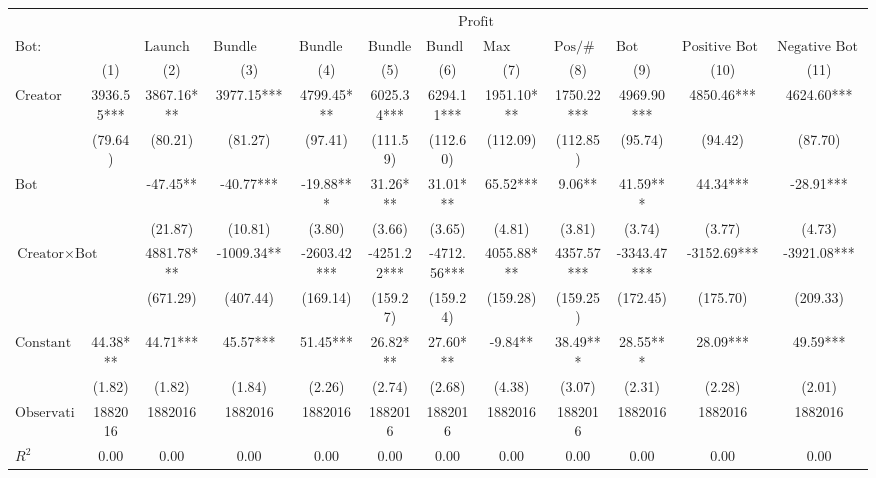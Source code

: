 \begin{tabular}{lccccccccccc}
\hline
 & \multicolumn{11}{c}{$\text{Profit}$} \\
 $\text{Bot}:$ &  & $\text{Launch Bundle}$ & $\text{Bundle Creator Buy}$ & $\text{Bundle Launch}$ & $\text{Bundle Buy}$ & $\text{Bundle Sell}$ & $\text{Max Same Txn}$ & $\text{Pos/\#Swaps}$ & $\text{Bot Comment}$ & $\text{Positive Bot Comment}$ & $\text{Negative Bot Comment}$ \\
 & (1) & (2) & (3) & (4) & (5) & (6) & (7) & (8) & (9) & (10) & (11)\\
\hline
$\text{Creator}$ & 3936.55*** & 3867.16*** & 3977.15*** & 4799.45*** & 6025.34*** & 6294.11*** & 1951.10*** & 1750.22*** & 4969.90*** & 4850.46*** & 4624.60*** \\
 & (79.64) & (80.21) & (81.27) & (97.41) & (111.59) & (112.60) & (112.09) & (112.85) & (95.74) & (94.42) & (87.70) \\
$\text{Bot}$ &  & -47.45** & -40.77*** & -19.88*** & 31.26*** & 31.01*** & 65.52*** & 9.06** & 41.59*** & 44.34*** & -28.91*** \\
 &  & (21.87) & (10.81) & (3.80) & (3.66) & (3.65) & (4.81) & (3.81) & (3.74) & (3.77) & (4.73) \\
$\text{Creator} \times \text{Bot}$ &  & 4881.78*** & -1009.34** & -2603.42*** & -4251.22*** & -4712.56*** & 4055.88*** & 4357.57*** & -3343.47*** & -3152.69*** & -3921.08*** \\
 &  & (671.29) & (407.44) & (169.14) & (159.27) & (159.24) & (159.28) & (159.25) & (172.45) & (175.70) & (209.33) \\
$\text{Constant}$ & 44.38*** & 44.71*** & 45.57*** & 51.45*** & 26.82*** & 27.60*** & -9.84** & 38.49*** & 28.55*** & 28.09*** & 49.59*** \\
 & (1.82) & (1.82) & (1.84) & (2.26) & (2.74) & (2.68) & (4.38) & (3.07) & (2.31) & (2.28) & (2.01) \\
$\text{Observations}$ & 1882016 & 1882016 & 1882016 & 1882016 & 1882016 & 1882016 & 1882016 & 1882016 & 1882016 & 1882016 & 1882016 \\
$R^2$ & 0.00 & 0.00 & 0.00 & 0.00 & 0.00 & 0.00 & 0.00 & 0.00 & 0.00 & 0.00 & 0.00 \\
\hline
\end{tabular}